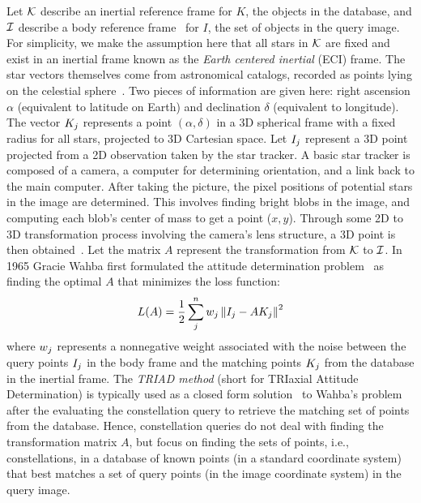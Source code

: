 Let $\mathcal{K}$ describe an inertial reference frame for $K$, the objects in the
database, and $\mathcal{I}$ describe a body reference
frame~\cite{wie:spaceVehicleDynamics} for $I$, the set of objects in the query image.
For simplicity, we make the assumption here that all stars in $\mathcal{K}$ are
fixed and exist in an inertial frame known as the \textit{Earth centered
inertial} (ECI) frame. The star vectors themselves come from astronomical
catalogs, recorded as points lying on the celestial
sphere~\cite{tappe:starTrackerDevelopment}. Two pieces of information are given
here: right ascension $\alpha$ (equivalent to latitude on Earth) and
declination $\delta$ (equivalent to longitude). The vector $K_j$ represents a point
$\left( \alpha, \delta \right)$ in a 3D spherical frame with a fixed radius for
all stars, projected to 3D Cartesian space.
Let $I_j$ represent a 3D point projected from a 2D observation taken by the star tracker.
A basic star tracker is composed of a camera, a computer for determining
orientation, and a link back to the main computer. After taking the picture,
the pixel positions of potential stars in the image are determined.  This
involves finding bright blobs in the image, and computing each blob's center of
mass to get a point ($x, y$).
Through some 2D to 3D transformation process involving the camera's lens structure, a 3D point is then
obtained~\cite{tappe:starTrackerDevelopment}.
Let the matrix $A$ represent the transformation from $\mathcal{K}$ to $\mathcal{I}$.
In 1965 Gracie Wahba first formulated the attitude determination
problem~\cite{wahba:attitudeEstimationProblem} as
finding the optimal $A$ that minimizes the loss function:
\begin{equation}
    L(A) = \frac{1}{2} \sum_j^n w_j \left\| I_j - AK_j \right\|^2
\end{equation}
where $w_j$ represents a nonnegative weight associated with the noise
between the query points $I_j$ in the body frame and the matching points $K_j$
from the database in the inertial frame. The \textit{TRIAD method} (short for
TRIaxial Attitude Determination) is typically used as a closed form
solution~\cite{markley:attitudeDeterminationTwoVectors} to Wahba's problem after
the evaluating the constellation query to retrieve the matching set of points
from the database.
Hence, constellation queries do not deal with finding the
transformation matrix $A$, but focus on finding the sets of points, i.e.,
constellations, in a database of known points (in a standard
coordinate system) that best matches a set of query points (in
the image coordinate system) in the query image.

